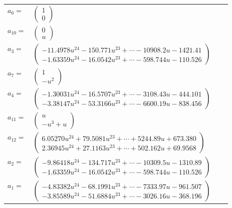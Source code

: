 \documentclass[1p]{elsarticle_modified}
\theoremstyle{definition}
\begin{document}
\begin{tabular}{m{7pt} m{180pt} m{7pt} m{180pt} }
\flushright $a_{6}=$&$\begin{pmatrix}1\\0\end{pmatrix}$ \\
\flushright $a_{10}=$&$\begin{pmatrix}0\\u\end{pmatrix}$ \\
\flushright $a_{3}=$&$\begin{pmatrix}-11.4978 u^{24}-150.771 u^{23}+\cdots-10908.2 u-1421.41\\-1.63359 u^{24}-16.0542 u^{23}+\cdots-598.744 u-110.526\end{pmatrix}$ \\
\flushright $a_{7}=$&$\begin{pmatrix}1\\- u^2\end{pmatrix}$ \\
\flushright $a_{4}=$&$\begin{pmatrix}-1.30031 u^{24}-16.5707 u^{23}+\cdots-3108.43 u-444.101\\-3.38147 u^{24}-53.3166 u^{23}+\cdots-6600.19 u-838.456\end{pmatrix}$ \\
\flushright $a_{11}=$&$\begin{pmatrix}u\\- u^3+u\end{pmatrix}$ \\
\flushright $a_{12}=$&$\begin{pmatrix}6.05270 u^{24}+79.5081 u^{23}+\cdots+5244.89 u+673.380\\2.36945 u^{24}+27.1163 u^{23}+\cdots+502.162 u+69.9568\end{pmatrix}$ \\
\flushright $a_{2}=$&$\begin{pmatrix}-9.86418 u^{24}-134.717 u^{23}+\cdots-10309.5 u-1310.89\\-1.63359 u^{24}-16.0542 u^{23}+\cdots-598.744 u-110.526\end{pmatrix}$ \\
\flushright $a_{1}=$&$\begin{pmatrix}-4.83382 u^{24}-68.1991 u^{23}+\cdots-7333.97 u-961.507\\-3.85589 u^{24}-51.6884 u^{23}+\cdots-3026.16 u-368.196\end{pmatrix}$ \\

\end{tabular}
\end{document}
